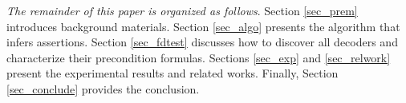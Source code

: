 \documentclass[journal]{IEEEtran}
\begin{document}




\emph{The remainder of this paper is organized as follows}.
Section \ref{sec_prem} introduces background materials.
Section \ref{sec_algo} presents the algorithm that infers assertions.
Section \ref{sec_fdtest} discusses how to discover all decoders and characterize their precondition formulas.
Sections \ref{sec_exp} and \ref{sec_relwork} present the experimental results and related works.
Finally,
Section \ref{sec_conclude} provides the conclusion.
\end{document}
